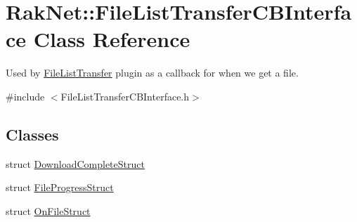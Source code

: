 \hypertarget{class_rak_net_1_1_file_list_transfer_c_b_interface}{\section{Rak\-Net\-:\-:File\-List\-Transfer\-C\-B\-Interface Class Reference}
\label{class_rak_net_1_1_file_list_transfer_c_b_interface}
}


Used by \hyperlink{class_rak_net_1_1_file_list_transfer}{File\-List\-Transfer} plugin as a callback for when we get a file.  




{\ttfamily \#include $<$File\-List\-Transfer\-C\-B\-Interface.\-h$>$}

\subsection*{Classes}
\begin{DoxyCompactItemize}
\item 
struct \hyperlink{struct_rak_net_1_1_file_list_transfer_c_b_interface_1_1_download_complete_struct}{Download\-Complete\-Struct}
\item 
struct \hyperlink{struct_rak_net_1_1_file_list_transfer_c_b_interface_1_1_file_progress_struct}{File\-Progress\-Struct}
\item 
struct \hyperlink{struct_rak_net_1_1_file_list_transfer_c_b_interface_1_1_on_file_struct}{On\-File\-Struct}
\end{DoxyCompactItemize}
